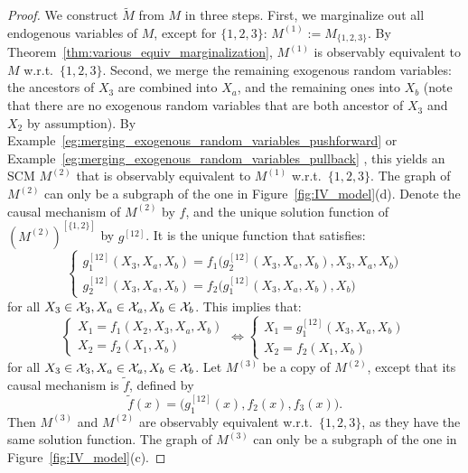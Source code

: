 \begin{proof}
  We construct $\tilde{M}$ from $M$ in three steps.
  First, we marginalize out all endogenous variables of $M$, except for $\{1,2,3\}$: $M^{(1)} := M_{\{1,2,3\}}.$
  By Theorem~\ref{thm:various_equiv_marginalization}, $M^{(1)}$ is observably equivalent to $M$ w.r.t.\ $\{1,2,3\}$.
  Second, we merge the remaining exogenous random variables: the ancestors of $X_3$ are combined into $X_a$, and the remaining ones into $X_b$ (note that there are no exogenous random variables that are both ancestor of $X_3$ and $X_2$ by assumption).
  By Example~\ref{eg:merging_exogenous_random_variables_pushforward} or Example~\ref{eg:merging_exogenous_random_variables_pullback} , this yields an SCM $M^{(2)}$ that is observably equivalent to $M^{(1)}$ w.r.t.\ $\{1,2,3\}$.
  The graph of $M^{(2)}$ can only be a subgraph of the one in Figure~\ref{fig:IV_model}(d).
  Denote the causal mechanism of $M^{(2)}$ by $f$, and the unique solution function of $(M^{(2)})^{[\{1,2\}]}$ by $g^{[12]}$.
  It is the unique function that satisfies:
  \begin{equation*}
    \begin{cases}
      g^{[12]}_1(X_3,X_a,X_b) = f_1\big(g^{[12]}_2(X_3,X_a,X_b),X_3,X_a,X_b\big) \\
      g^{[12]}_2(X_3,X_a,X_b) = f_2\big(g^{[12]}_1(X_3,X_a,X_b),X_b\big)
    \end{cases}
  \end{equation*}
  for all $X_3 \in \mathcal{X}_3,X_a \in \mathcal{X}_a,X_b \in \mathcal{X}_b$. This implies that:
  \begin{equation*}
  \begin{cases}
    X_1 = f_1(X_2,X_3,X_a,X_b) \\
    X_2 = f_2(X_1,X_b)
  \end{cases} \iff
  \begin{cases}
    X_1 = g^{[12]}_1(X_3,X_a,X_b) \\
    X_2 = f_2(X_1,X_b)
  \end{cases} 
  \end{equation*}
  for all $X_3 \in \mathcal{X}_3,X_a \in \mathcal{X}_a,X_b \in \mathcal{X}_b$.
  Let $M^{(3)}$ be a copy of $M^{(2)}$, except that its causal mechanism is $\tilde{f}$, defined by
  $$\tilde{f}(x) = \big(g^{[12]}_1(x), f_2(x), f_3(x)\big).$$
  Then $M^{(3)}$ and $M^{(2)}$ are observably equivalent w.r.t.\ $\{1,2,3\}$, as they have the same solution function.
  The graph of $M^{(3)}$ can only be a subgraph of the one in Figure~\ref{fig:IV_model}(c).
\end{proof}
